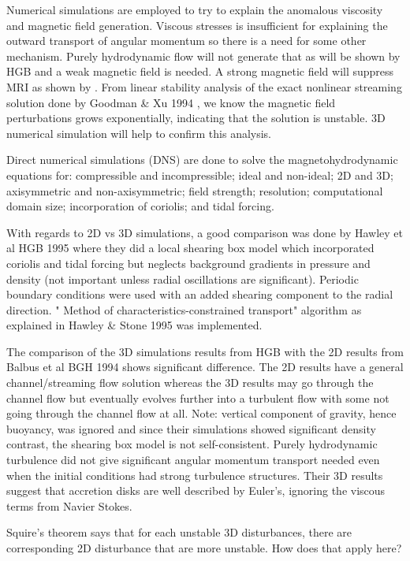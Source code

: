 \documentclass{jfm}
\begin{document}
Numerical simulations are employed to try to explain the anomalous viscosity and magnetic field generation. Viscous stresses is insufficient for explaining the outward transport of angular momentum so there is a need for some other mechanism. Purely hydrodynamic flow will not generate that as will be shown by HGB and a weak magnetic field is needed. A strong magnetic field will suppress MRI as shown by \cite{Liu2008}. From linear stability analysis of the exact nonlinear streaming solution done by Goodman \& Xu 1994 \cite{Goodman1994}, we know the magnetic field perturbations grows exponentially, indicating that the solution is unstable. 3D numerical simulation will help to confirm this analysis.

Direct numerical simulations (DNS) are done to solve the magnetohydrodynamic equations for: compressible and incompressible; ideal and non-ideal; 2D and 3D; axisymmetric and non-axisymmetric; field strength; resolution; computational domain size; incorporation of coriolis; and tidal forcing.

With regards to 2D vs 3D simulations, a good comparison was done by Hawley et al HGB 1995 where they did a local shearing box model which incorporated coriolis and tidal forcing but neglects background gradients in pressure and density (not important unless radial oscillations are significant). Periodic boundary conditions were used with an added shearing component to the radial direction. " Method of characteristics-constrained transport" algorithm as explained in Hawley \& Stone 1995 \cite{Hawley1995} was implemented.

The comparison of the 3D simulations results from HGB with the 2D results from Balbus et al BGH 1994 shows significant difference. The 2D results have a general channel/streaming flow solution whereas the 3D results may go through the channel flow but eventually evolves further into a turbulent flow with some not going through the channel flow at all. Note: vertical component of gravity, hence buoyancy, was  ignored and since their simulations showed significant density contrast, the shearing box model is not self-consistent. Purely hydrodynamic turbulence did not give significant angular momentum transport needed even when the initial conditions had strong turbulence structures. Their 3D results suggest that accretion disks are well described by Euler's, ignoring the viscous terms from Navier Stokes.

Squire's theorem says that for each unstable 3D disturbances, there are corresponding 2D disturbance that are more unstable. How does that apply here?
\end{document}
